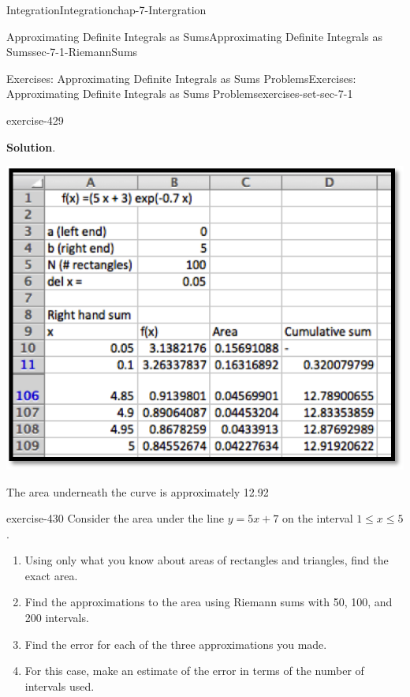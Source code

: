 \documentclass[oneside,10pt,]{book}
\numberwithin{equation}{section}
\begin{document}
\begin{chapterptx}{Integration}{}{Integration}{}{}{chap-7-Intergration}
\begin{sectionptx}{Approximating Definite Integrals as Sums}{}{Approximating Definite Integrals as Sums}{}{}{sec-7-1-RiemannSums}
\begin{exercises-subsection-numberless}{Exercises: Approximating Definite Integrals as Sums Problems}{}{Exercises: Approximating Definite Integrals as Sums Problems}{}{}{exercises-set-sec-7-1}
\begin{divisionexercise}{7}{}{}{exercise-429}
\par\smallskip%
\noindent\textbf{Solution}.\hypertarget{solution-217}{}\quad%
\leavevmode%
\begin{sidebyside}{1}{0.2}{0.2}{0}%
\begin{sbspanel}{0.6}%
\includegraphics[width=1\linewidth]{images/sec7-1-sol7a.png}
\end{sbspanel}%
\end{sidebyside}%
\par
\hypertarget{p-2584}{}%
The area underneath the curve is approximately 12.92%
\end{divisionexercise}%
\begin{divisionexercise}{8}{}{}{exercise-430}%
\hypertarget{p-2585}{}%
Consider the area under the line \(y = 5 x + 7\) on the interval \(1 \le  x \le  5\).%
\leavevmode%
\begin{enumerate}[label=(\alph*)]
\item\hypertarget{li-687}{}\hypertarget{p-2586}{}%
Using only what you know about areas of rectangles and triangles, find the exact area.%
\item\hypertarget{li-688}{}\hypertarget{p-2587}{}%
Find the approximations to the area using Riemann sums with 50, 100, and 200 intervals.%
\item\hypertarget{li-689}{}\hypertarget{p-2588}{}%
Find the error for each of the three approximations you made.%
\item\hypertarget{li-690}{}\hypertarget{p-2589}{}%
For this case, make an estimate of the error in terms of the number of intervals used.%
\end{enumerate}

\end{divisionexercise}
\end{exercises-subsection-numberless}
\end{sectionptx}
\end{chapterptx}
\end{document}
